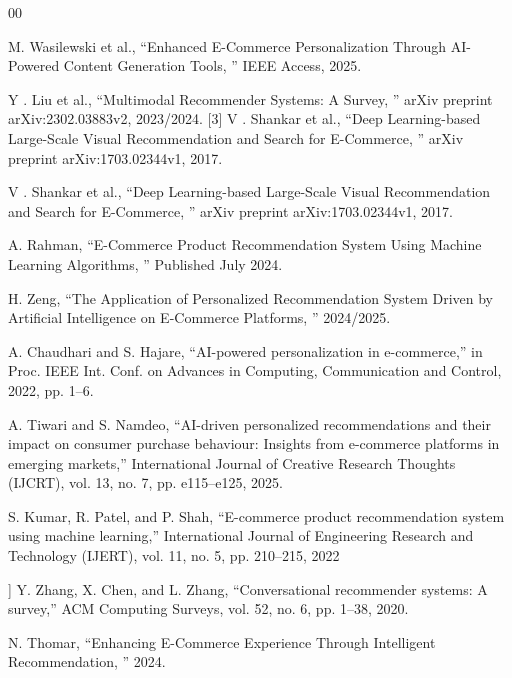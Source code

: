 \documentclass[conference]{IEEEtran}
\begin{document}
\begin{thebibliography}{00}

M. Wasilewski et al.,
“Enhanced E-Commerce
Personalization Through AI-Powered Content
Generation Tools,
” IEEE Access, 2025.

 Y . Liu et al.,
“Multimodal Recommender Systems: A
Survey,
” arXiv preprint arXiv:2302.03883v2, 2023/2024.
[3] V . Shankar et al.,
“Deep Learning-based Large-Scale
Visual Recommendation and Search for E-Commerce,
”
arXiv preprint arXiv:1703.02344v1, 2017.

 V . Shankar et al.,
“Deep Learning-based Large-Scale
Visual Recommendation and Search for E-Commerce,
”
arXiv preprint arXiv:1703.02344v1, 2017.

  A. Rahman,
“E-Commerce Product Recommendation
System Using Machine Learning Algorithms,
” Published
July 2024.

  H. Zeng,
“The Application of Personalized
Recommendation System Driven by Artificial
Intelligence on E-Commerce Platforms,
” 2024/2025.

 A. Chaudhari and S. Hajare, “AI-powered personalization in e-commerce,” in Proc. IEEE Int. Conf. on Advances in Computing, Communication and Control, 2022, pp. 1–6.

A. Tiwari and S. Namdeo, “AI-driven personalized recommendations and their impact on consumer purchase behaviour: Insights from e-commerce platforms in emerging markets,” International Journal of Creative Research Thoughts (IJCRT), vol. 13, no. 7, pp. e115–e125, 2025.

S. Kumar, R. Patel, and P. Shah, “E-commerce product recommendation system using machine learning,” International Journal of Engineering Research and Technology (IJERT), vol. 11, no. 5, pp. 210–215, 2022

 ] Y. Zhang, X. Chen, and L. Zhang, “Conversational recommender systems: A survey,” ACM Computing Surveys, vol. 52, no. 6, pp. 1–38, 2020.

 N. Thomar,
“Enhancing E-Commerce Experience
Through Intelligent Recommendation,
” 2024.


\end{thebibliography}

\vspace{12pt}
\end{document}
